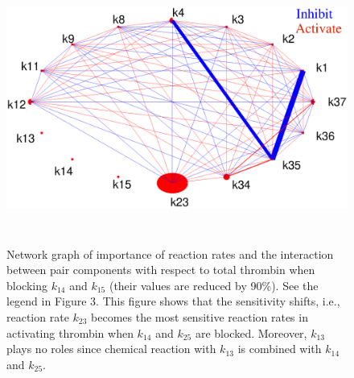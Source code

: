 \begin{figure}
\begin{center}
  \includegraphics[width=5in,height=3.5in]{NSAD.eps}
\caption{ Network graph of importance of reaction rates and the
interaction between pair components with respect to total thrombin
when blocking $k_{14}$ and $k_{15}$ (their values are reduced by
90\%). See the legend in Figure 3. This figure shows that the
sensitivity shifts, i.e., reaction rate $k_{23}$ becomes the most
sensitive reaction rates in activating thrombin when $k_{14}$ and
$k_{25}$ are blocked. Moreover, $k_{13}$ plays no roles since
chemical reaction with $k_{13}$ is combined with $k_{14}$ and
$k_{25}$. }\label{Fig:NSAD}

  \end{center}
\end{figure}

